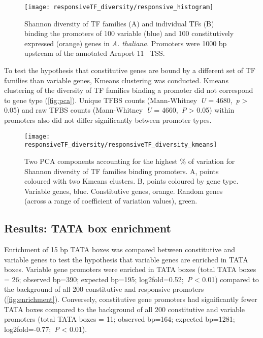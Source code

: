 \begin{figure}[!h]
\begin{center}
\capstart
\texttt{[image: responsiveTF\_diversity/responsive\_histogram]}
\caption{Shannon diversity of TF families (A) and individual TFs (B) binding the promoters of 100 variable (blue) and 100 constitutively expressed (orange) genes in \textit{A. thaliana}. Promoters were 1000 bp upstream of the annotated Araport 11~\autocite{chengAraport11CompleteReannotation2017} TSS.
\label{fig:diversity-histogram}
}
\end{center}
\end{figure}


To test the hypothesis that constitutive genes are bound by a different set of TF families than variable genes, Kmeans clustering was conducted. Kmeans clustering of the diversity of TF families binding a promoter did not correspond to gene type (\autoref{fig:pca}).
Unique TFBS counts (Mann\hyp{}Whitney~\textit{U} = 4680,~\textit{p} \textgreater{} 0.05)
and raw TFBS counts (Mann\hyp{}Whitney~\textit{U} = 4660,~\textit{P}
\textgreater{} 0.05) within promoters also did not differ significantly between promoter types.

\begin{figure}[!ht]
	\begin{center}
		\capstart
		\texttt{[image: responsiveTF\_diversity/responsiveTF\_diversity\_kmeans]}
		\caption{Two PCA components accounting for the highest \si{\percent} of variation for Shannon diversity of TF families binding promoters. A, points coloured with two Kmeans clusters. B, points coloured by gene type. Variable genes, blue. Constitutive genes, orange. Random genes (across a range of coefficient of variation values), green.
			\label{fig:pca}
		}
	\end{center}
\end{figure}

\subsection{Results: TATA box enrichment}
Enrichment of 15 bp TATA boxes was compared between constitutive and
variable genes to test the hypothesis that variable genes are enriched in TATA boxes. Variable gene promoters were enriched in TATA boxes (total TATA boxes = 26; observed bp=390; expected bp=195; log2fold=0.52;~\textit{P} \textless{} 0.01) compared to the background of all 200 constitutive and responsive promoters
(\autoref{fig:enrichment}). Conversely, constitutive gene
promoters had significantly fewer TATA boxes compared to the background of all 200 constitutive and variable promoters (total TATA boxes = 11; observed bp=164; expected bp=1281; log2fold=-0.77;~\textit{P} \textless{} 0.01).

